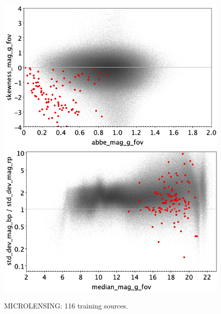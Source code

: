\documentclass[longauth]{aa}
\begin{document}
\begin{appendix}
\begin{figure}
\vspace{4mm}
 \includegraphics[width=0.45\hsize]{figures/appendix/MICROLENSING_trn_ask.png}  %
\hspace{2mm}
 \includegraphics[width=0.45\hsize]{figures/appendix/MICROLENSING_trn_msdr.png}  \\ %
\vspace{4mm}
 \caption{MICROLENSING: 116 training sources.}  
 \label{fig:app:MICROLENSING_trn}
\end{figure}


\end{appendix}
\end{document}
